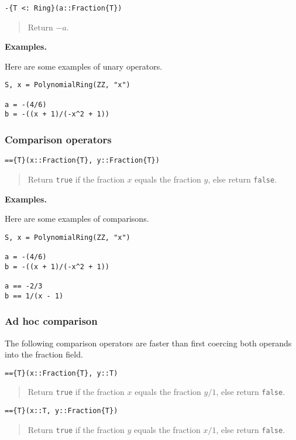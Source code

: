 \documentclass[a4paper,10pt]{article}
\newcommand{\code}{\lstinline}
\newcommand{\desc}[1]{\vspace{-3mm}\begin{quote}#1\end{quote}}
\begin{document}
{{{\begin{lstlisting}
-{T <: Ring}(a::Fraction{T})
\end{lstlisting}

\desc{Return $-a$.}

\textbf{Examples.}

Here are some examples of unary operators.

\begin{lstlisting}
S, x = PolynomialRing(ZZ, "x")

a = -(4/6)
b = -((x + 1)/(-x^2 + 1))
\end{lstlisting}

\subsubsection{Comparison operators}

\begin{lstlisting}
=={T}(x::Fraction{T}, y::Fraction{T})
\end{lstlisting}

\desc{Return \code{true} if the fraction $x$ equals the fraction $y$, else
return \code{false}.}

\textbf{Examples.}

Here are some examples of comparisons.

\begin{lstlisting}
S, x = PolynomialRing(ZZ, "x")

a = -(4/6)
b = -((x + 1)/(-x^2 + 1))

a == -2/3
b == 1/(x - 1)
\end{lstlisting}

\subsubsection{Ad hoc comparison}

The following comparison operators are faster than first coercing both
operands into the fraction field.

\begin{lstlisting}
=={T}(x::Fraction{T}, y::T)
\end{lstlisting}

\desc{Return \code{true} if the fraction $x$ equals the fraction $y/1$, else
return \code{false}.}

\begin{lstlisting}
=={T}(x::T, y::Fraction{T})
\end{lstlisting}

\desc{Return \code{true} if the fraction $y$ equals the fraction $x/1$, else
return \code{false}.}

}}}
\end{document}
